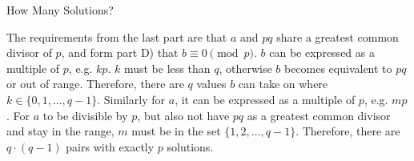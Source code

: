 \begin{homeworkProblem}{How Many Solutions?}
\begin{itemize}
        The requirements from the last part are that $a$ and $pq$ share a greatest 
        common divisor of $p$, and form part D) that $b \equiv 0 \pmod{p}$. $b$
        can be expressed as a multiple of $p$, e.g. $kp$. $k$ must be less than
        $q$, otherwise $b$ becomes equivalent to $pq$ or out of range. Therefore,
        there are $q$ values $b$ can take on where $k \in \{ 0, 1, \dots, q-1 \}$.
        Similarly for $a$, it can be expressed as a multiple of $p$, e.g. $mp$.
        For $a$ to be divisible by $p$, but also not have $pq$ as a greatest
        common divisor and stay in the range, $m$ must be in the set $\{ 1, 2, \dots, q-1 \}$.
        Therefore, there are $q \cdot (q-1)$ pairs with exactly $p$ solutions.


    \end{itemize}
    
\end{homeworkProblem}